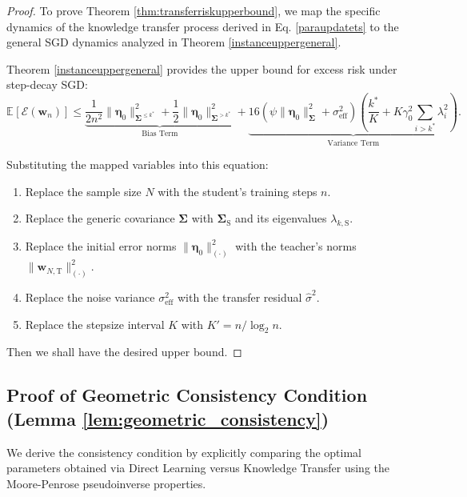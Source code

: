 \documentclass{article}
\theoremstyle{definition}
\theoremstyle{definition}
\theoremstyle{plain}
\theoremstyle{plain}
\theoremstyle{plain}
\theoremstyle{plain}
\theoremstyle{plain}
\newcommand{\bs}[1]{\boldsymbol{\mathbf{#1}}}
\newcommand{\te}{\mathrm{T}}
\newcommand{\st}{\mathrm{S}}
\newcommand{\eff}{\mathrm{eff}}
\newcommand{\Sig}{\mathbf{\Sigma}}
\newcommand{\w}{\mathbf{w}}
\newcommand{\ex}[2][]{\mathbb{E}_{#1}\left[ #2 \right]}
\begin{document}
\begin{proof}
    To prove Theorem \ref{thm:transferriskupperbound}, we map the specific dynamics of the knowledge transfer process derived in Eq. \eqref{paraupdatets} to the general SGD dynamics analyzed in Theorem \ref{instanceuppergeneral}.

    Theorem \ref{instanceuppergeneral} provides the upper bound for excess risk under step-decay SGD:
    \begin{equation}
        \ex{\mathcal{E}(\bs w_n)} \leq \underbrace{\frac{1}{2n^2}\|\bs\eta_0\|^2_{\Sig^{\leq k^*}} + \frac{1}{2}\|\bs\eta_0\|^2_{\Sig^{>k^*}}}_{\text{Bias Term}} + \underbrace{16(\psi\|\bs\eta_0\|^2_{\bs\Sigma}+\sigma_\eff^2)\left( \frac{k^*}{K} + K\gamma_0^2 \sum_{i > k^*} \lambda_{i}^2 \right)}_{\text{Variance Term}}.
    \end{equation}
    
    Substituting the mapped variables into this equation:
    \begin{enumerate}
        \item Replace the sample size $N$ with the student's training steps $n$.
        \item Replace the generic covariance $\bs\Sigma$ with $\bs\Sigma_\st$ and its eigenvalues $\lambda_{k,\st}$.
        \item Replace the initial error norms $\|\bs\eta_0\|^2_{(\cdot)}$ with the teacher's norms $\|\w_{N,\te}\|^2_{(\cdot)}$.
        \item Replace the noise variance $\sigma_\eff^2$ with the transfer residual $\hat\sigma^2$.
        \item Replace the stepsize interval $K$ with $K' = n/\log_2n$.
    \end{enumerate}
    Then we shall have the desired upper bound.
\end{proof}

\subsection{Proof of Geometric Consistency Condition (Lemma \ref{lem:geometric_consistency})}
\label{proof:geometric_consistency}

We derive the consistency condition by explicitly comparing the optimal parameters obtained via Direct Learning versus Knowledge Transfer using the Moore-Penrose pseudoinverse properties.
\end{document}
